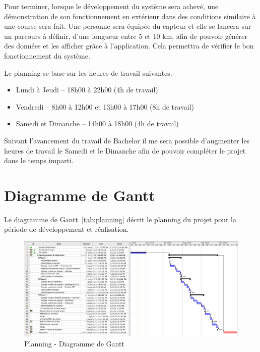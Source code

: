Pour terminer, lorsque le développement du système sera achevé, une démonstration de son fonctionnement en extérieur dans des conditions similaire à une course sera fait. Une personne sera équipée du capteur et elle se lancera sur un parcours à définir, d’une longueur entre 5 et 10 km, afin de pouvoir générer des données et les afficher grâce à l’application. Cela permettra de vérifier le bon fonctionnement du système.

Le planning se base sur les heures de travail suivantes.

\begin{itemize}
\item Lundi à Jeudi – 18h00 à 22h00 (4h de travail)
\item Vendredi – 8h00 à 12h00 et 13h00 à 17h00 (8h de travail)
\item Samedi et Dimanche – 14h00 à 18h00 (4h de travail)
\end{itemize}

Suivant l’avancement du travail de Bachelor il me sera possible d’augmenter les heures de travail le Samedi et le Dimanche afin de pouvoir compléter le projet dans le temps imparti. 

\newpage
{}
\recalctypearea

\section{Diagramme de Gantt}

Le diagramme de Gantt~\ref{tab:planning} décrit le planning du projet pour la période de développement et réalisation.

\begin{figure}[htb]
\centering 
\includegraphics[width=1\columnwidth]{../../planning/gantt_planning.png} 
\caption[Planning - Diagramme de Gantt]{Planning - Diagramme de Gantt}
\label{fig:planning}
\end{figure}

\newpage
{}
\recalctypearea